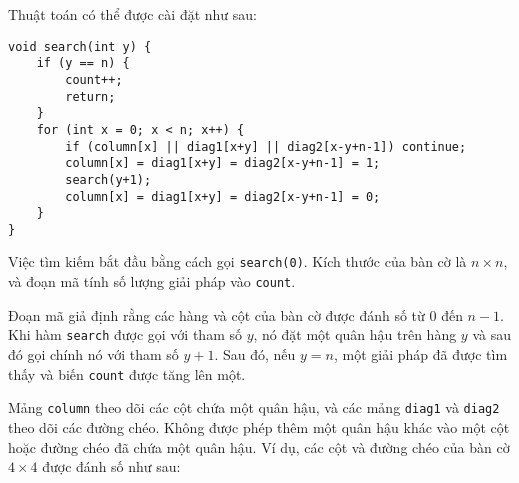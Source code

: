 \begin{samepage}
Thuật toán có thể được cài đặt như sau:
\begin{lstlisting}
void search(int y) {
    if (y == n) {
        count++;
        return;
    }
    for (int x = 0; x < n; x++) {
        if (column[x] || diag1[x+y] || diag2[x-y+n-1]) continue;
        column[x] = diag1[x+y] = diag2[x-y+n-1] = 1;
        search(y+1);
        column[x] = diag1[x+y] = diag2[x-y+n-1] = 0;
    }
}
\end{lstlisting}
\end{samepage}
Việc tìm kiếm bắt đầu bằng cách gọi \texttt{search(0)}.
Kích thước của bàn cờ là $n \times n$,
và đoạn mã tính số lượng giải pháp
vào \texttt{count}.

Đoạn mã giả định rằng các hàng và cột
của bàn cờ được đánh số từ 0 đến $n-1$.
Khi hàm \texttt{search} được
gọi với tham số $y$,
nó đặt một quân hậu trên hàng $y$
và sau đó gọi chính nó với tham số $y+1$.
Sau đó, nếu $y=n$, một giải pháp đã được tìm thấy
và biến \texttt{count} được tăng lên một.

Mảng \texttt{column} theo dõi các cột
chứa một quân hậu,
và các mảng \texttt{diag1} và \texttt{diag2}
theo dõi các đường chéo.
Không được phép thêm một quân hậu khác vào một
cột hoặc đường chéo đã chứa một quân hậu.
Ví dụ, các cột và đường chéo của
bàn cờ $4 \times 4$ được đánh số như sau:

